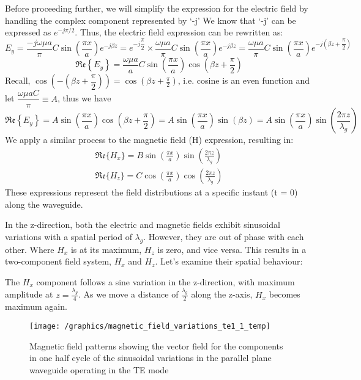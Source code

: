 Before proceeding further, we will simplify the expression for the electric field by handling the complex component represented by `-j' We know that `-j' can be expressed as $e^{-j\pi/2}$. Thus, the electric field expression can be rewritten as:
\begin{dmath*}
E_y = \dfrac{-j\omega\mu a}{\pi}C\sin(\dfrac{\pi x}{a})e^{
-j\beta z}
=e^{-j\dfrac{\pi}{2}}\times\dfrac{\omega \mu a}{\pi}C\sin(\dfrac{\pi x}{a})e^{-j\beta z}
= \dfrac{\omega \mu a}{\pi}C\sin(\dfrac{\pi x}{a})e^{-j\left(\beta z + \dfrac{\pi}{2}\right)
}
\end{dmath*}
\begin{dmath*}
\mathfrak{Re}\left\{E_y\right\} = \dfrac{\omega \mu a}{a}C\sin(\dfrac{\pi x}{a})\cos(\beta z + \dfrac{\pi}{2})
\end{dmath*}
Recall, $\cos(-\left(\beta z + \dfrac{\pi}{2}\right))=\cos(\beta z + \frac{\pi}{2})$, i.e. cosine is an even function and let ${\dfrac{\omega \mu aC}{\pi}\equiv A}$, thus we have 
\begin{dmath*}
\mathfrak{Re}\left\{E_y\right\} = A\sin(\dfrac{\pi x}{a})\cos(\beta z +\dfrac{\pi}{2}) = A\sin(\dfrac{\pi x}{a})\sin(\beta z) = A\sin(\dfrac{\pi x}{a})\sin(\dfrac{2\pi z}{\lambda_g})
\end{dmath*}
We apply a similar process to the magnetic field (H) expression, resulting in:
\begin{align*}
\mathfrak{Re}\{H_x\} = B\sin(\frac{\pi x}{a})\sin(\frac{2\pi z}{\lambda_g})\\
\mathfrak{Re}\{H_z\}= C\cos(\frac{\pi x}{a})\cos(\frac{2\pi z}{\lambda_g})
\end{align*}
These expressions represent the field distributions at a specific instant (t = 0) along the waveguide.

In the z-direction, both the electric and magnetic fields exhibit sinusoidal variations with a spatial period of $\lambda_g$. However, they are out of phase with each other. Where $H_x$ is at its maximum, $H_z$ is zero, and vice versa. This results in a two-component field system, $H_x$ and $H_z$. Let's examine their spatial behaviour:

The $H_x$ component follows a sine variation in the z-direction, with maximum amplitude at $z = \frac{\lambda_g}{4}$. As we move a distance of $\frac{\lambda_g}{2}$ along the z-axis, $H_x$ becomes maximum again. 
\begin{figure}[h]
\centering
\texttt{[image: /graphics/magnetic\_field\_variations\_te1\_1\_temp]}
\caption{Magnetic field patterns showing the vector field for the components in one half cycle of the sinusoidal variations in the parallel plane waveguide operating in the TE mode}
\label{fig:watson}
\end{figure}

